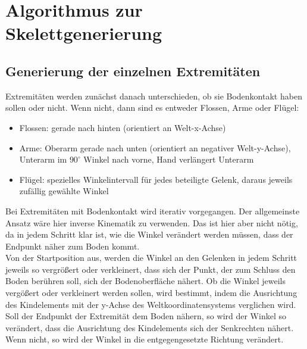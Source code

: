 \chapter{Algorithmus zur Skelettgenerierung}

\section{Generierung der einzelnen Extremitäten}
\label{section:extremity_generation}

Extremitäten werden zunächst danach unterschieden, ob sie Bodenkontakt haben sollen oder nicht.
Wenn nicht, dann sind es entweder Flossen, Arme oder Flügel:

\begin{itemize}
 \item Flossen: gerade nach hinten (orientiert an Welt-x-Achse)
 \item Arme: Oberarm gerade nach unten (orientiert an negativer Welt-y-Achse), Unterarm im $90^{\circ}$ Winkel nach vorne, Hand verlängert Unterarm 
 \item Flügel: spezielles Winkelintervall für jedes beteiligte Gelenk, daraus jeweils zufällig gewählte Winkel
\end{itemize}

Bei Extremitäten mit Bodenkontakt wird iterativ vorgegangen. Der allgemeinste Ansatz wäre hier inverse Kinematik zu verwenden. Das ist hier aber nicht nötig, da in jedem Schritt klar ist, wie die Winkel verändert werden müssen, dass der Endpunkt näher zum Boden kommt. \\
Von der Startposition aus, werden die Winkel an den Gelenken in jedem Schritt jeweils so vergrößert oder verkleinert, dass sich der Punkt, der zum Schluss den Boden berühren soll, sich der Bodenoberfläche nähert. Ob die Winkel jeweils vergößert oder verkleinert werden sollen, wird bestimmt, indem die Ausrichtung des Kindelements mit der y-Achse des Weltkoordinatensystems verglichen wird. Soll der Endpunkt der Extremität dem Boden nähern, so wird der Winkel so verändert, dass die Ausrichtung des Kindelements sich der Senkrechten nähert. Wenn nicht, so wird der Winkel in die entgegengesetzte Richtung verändert. 

